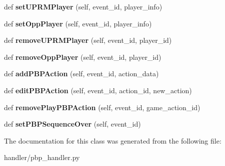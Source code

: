 \begin{DoxyCompactItemize}
def {\bfseries set\+U\+P\+R\+M\+Player} (self, event\+\_\+id, player\+\_\+info)
\item 
\mbox{\label{classhandler_1_1pbp__handler_1_1_volleyball_p_b_p_handler_ab6f1cfbd5900c8264ebc3d56982d111d}} 
def {\bfseries set\+Opp\+Player} (self, event\+\_\+id, player\+\_\+info)
\item 
\mbox{\label{classhandler_1_1pbp__handler_1_1_volleyball_p_b_p_handler_a4255f84db5a5c9f4ef7922a2b9d04c0a}} 
def {\bfseries remove\+U\+P\+R\+M\+Player} (self, event\+\_\+id, player\+\_\+id)
\item 
\mbox{\label{classhandler_1_1pbp__handler_1_1_volleyball_p_b_p_handler_a62bd2008499c4b5f504dddc884ca01b2}} 
def {\bfseries remove\+Opp\+Player} (self, event\+\_\+id, player\+\_\+id)
\item 
\mbox{\label{classhandler_1_1pbp__handler_1_1_volleyball_p_b_p_handler_a10b7b1b4d77c4735a0d122cdc9ff9ced}} 
def {\bfseries add\+P\+B\+P\+Action} (self, event\+\_\+id, action\+\_\+data)
\item 
\mbox{\label{classhandler_1_1pbp__handler_1_1_volleyball_p_b_p_handler_aa611d81a64cef940be80bf1a7e942925}} 
def {\bfseries edit\+P\+B\+P\+Action} (self, event\+\_\+id, action\+\_\+id, new\+\_\+action)
\item 
\mbox{\label{classhandler_1_1pbp__handler_1_1_volleyball_p_b_p_handler_ad92125b0fb3dda3cbce9462027329ec3}} 
def {\bfseries remove\+Play\+P\+B\+P\+Action} (self, event\+\_\+id, game\+\_\+action\+\_\+id)
\item 
\mbox{\label{classhandler_1_1pbp__handler_1_1_volleyball_p_b_p_handler_aadd6ddad362e098ade44269a18ba56fe}} 
def {\bfseries set\+P\+B\+P\+Sequence\+Over} (self, event\+\_\+id)
\end{DoxyCompactItemize}


The documentation for this class was generated from the following file\+:\begin{DoxyCompactItemize}
\item 
handler/pbp\+\_\+handler.\+py\end{DoxyCompactItemize}
